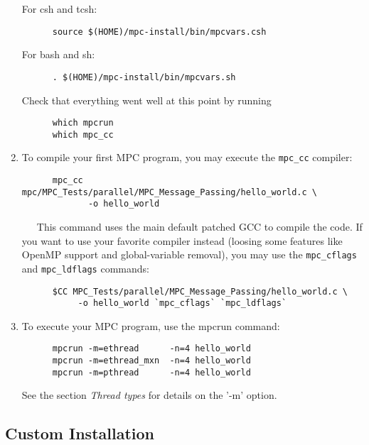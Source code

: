 \documentclass[a4paper,11pt]{article}
\begin{document}
\begin{enumerate}
For csh and tcsh:

\begin{lstlisting}
      source $(HOME)/mpc-install/bin/mpcvars.csh
\end{lstlisting}

    For bash and sh:

\begin{lstlisting}
      . $(HOME)/mpc-install/bin/mpcvars.sh
\end{lstlisting}


    Check that everything went well at this point by running

\begin{lstlisting}
      which mpcrun
      which mpc_cc
\end{lstlisting}

\item  To compile your first MPC program, you
may execute the \texttt{mpc\_cc} compiler:


\begin{lstlisting}
      mpc_cc mpc/MPC_Tests/parallel/MPC_Message_Passing/hello_world.c \
             -o hello_world
\end{lstlisting}

~~~This command uses the main default patched GCC to compile the code.
If you want to use your favorite compiler instead (loosing some features like
    OpenMP support and global-variable removal), you may use the
\texttt{mpc\_cflags} and \texttt{mpc\_ldflags} commands:

\begin{lstlisting}
      $CC MPC_Tests/parallel/MPC_Message_Passing/hello_world.c \
           -o hello_world `mpc_cflags` `mpc_ldflags`
\end{lstlisting}

\item  To execute your MPC program, use the mpcrun command:

\begin{lstlisting}
      mpcrun -m=ethread      -n=4 hello_world
      mpcrun -m=ethread_mxn  -n=4 hello_world
      mpcrun -m=pthread      -n=4 hello_world
\end{lstlisting}

    See the section \emph{Thread types} for details on the '-m' option.

\end{enumerate}

\subsection{Custom Installation}
\end{document}
